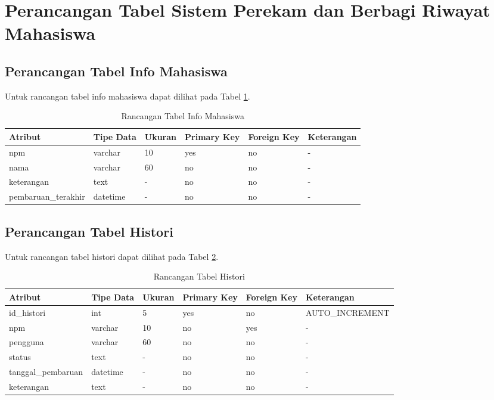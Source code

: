 \section{Perancangan Tabel Sistem Perekam dan Berbagi Riwayat Mahasiswa}
\label{sec:perancangantabel}

\subsection{Perancangan Tabel Info Mahasiswa}
Untuk rancangan tabel info mahasiswa dapat dilihat pada Tabel
\ref{tab:rancangantabelinfomahasiswa}.

\begin{table}[ht]
\caption[Tabel Rancangan Tabel Info Mahasiswa]{Rancangan Tabel Info Mahasiswa}
\label{tab:rancangantabelinfomahasiswa}
\centering
\begin{tabular}{|l|l|p{1.2cm}|p{1.2cm}|p{1.2cm}|l|}
\hline
Atribut & Tipe Data & Ukuran & Primary Key & Foreign Key & Keterangan\\
\hline
npm & varchar & 10 & yes & no & -\\
\hline
nama & varchar & 60 & no & no & -\\
\hline
keterangan & text & - & no & no & -\\
\hline
pembaruan\_terakhir & datetime & - & no & no & -\\
\hline
\end{tabular}
\end{table}

\subsection{Perancangan Tabel Histori}
Untuk rancangan tabel histori dapat dilihat pada Tabel
\ref{tab:rancangantabelhistori}.

\begin{table}[ht]
\caption[Tabel Rancangan Tabel Histori]{Rancangan Tabel Histori}
\label{tab:rancangantabelhistori}
\centering
\begin{tabular}{|l|l|p{1.2cm}|p{1.2cm}|p{1.2cm}|l|}
\hline
Atribut & Tipe Data & Ukuran & Primary Key & Foreign Key & Keterangan\\
\hline
id\_histori & int & 5 & yes & no & AUTO\_INCREMENT\\
\hline
npm & varchar & 10 & no & yes & -\\
\hline
pengguna & varchar & 60 & no & no & -\\
\hline
status & text & - & no & no & -\\
\hline
tanggal\_pembaruan & datetime & - & no & no & -\\
\hline
keterangan & text & - & no & no & -\\
\hline
\end{tabular}
\end{table}

